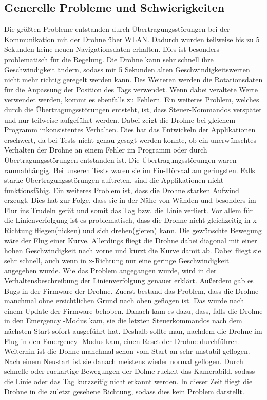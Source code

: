 \subsection*{Generelle Probleme und Schwierigkeiten}

Die größten Probleme entstanden durch Übertragungsstörungen bei der Kommunikation mit der Drohne über WLAN. Dadurch wurden teilweise bis zu 5 Sekunden keine neuen Navigationsdaten erhalten. Dies ist besonders problematisch für die Regelung. Die Drohne kann sehr schnell ihre Geschwindigkeit ändern, sodass mit 5 Sekunden alten Geschwindigkeitswerten nicht mehr richtig geregelt werden kann. Des Weiteren werden die Rotationsdaten für die Anpassung der Position des Tags verwendet. Wenn dabei veraltete Werte verwendet werden, kommt es ebenfalls zu Fehlern. Ein weiteres Problem, welches durch die Übertragungsstörungen entsteht, ist, dass Steuer-\/Kommandos verspätet und nur teilweise aufgeführt werden. Dabei zeigt die Drohne bei gleichem Programm inkonsistentes Verhalten. Dies hat das Entwickeln der Applikationen erschwert, da bei Tests nicht genau gesagt werden konnte, ob ein unerwünschtes Verhalten der Drohne an einem Fehler im Programm oder durch Übertragungsstörungen entstanden ist. Die Übertragungsstörungen waren raumabhängig. Bei unseren Tests waren sie im Fin-\/Hörsaal am geringsten. Falls starke Übertragungsstörungen auftreten, sind die Applikationen nicht funktionsfähig. Ein weiteres Problem ist, dass die Drohne starken Aufwind erzeugt. Dies hat zur Folge, dass sie in der Nähe von Wänden und besonders im Flur ins Trudeln gerät und somit das Tag bzw. die Linie verliert. Vor allem für die Linienverfolgung ist es problematisch, dass die Drohne nicht gleichzeitig in x-\/Richtung fliegen(nicken) und sich drehen(gieren) kann. Die gewünschte Bewegung wäre der Flug einer Kurve. Allerdings fliegt die Drohne dabei diagonal mit einer hohen Geschwindigkeit nach vorne und kürzt die Kurve damit ab. Dabei fliegt sie sehr schnell, auch wenn in x-\/Richtung nur eine geringe Geschwindigkeit angegeben wurde. Wie das Problem angegangen wurde, wird in der Verhaltensbeschreibung der Linienverfolgung genauer erklärt. Außerdem gab es Bugs in der Firmware der Drohne. Zuerst bestand das Problem, dass die Drohne manchmal ohne ersichtlichen Grund nach oben geflogen ist. Das wurde nach einem Update der Firmware behoben. Danach kam es dazu, dass, falls die Drohne in den Emergency -\/Modus kam, sie die letzten Steuerkommandos nach dem nächsten Start sofort ausgeführt hat. Deshalb sollte man, nachdem die Drohne im Flug in den Emergency -\/Modus kam, einen Reset der Drohne durchführen. Weiterhin ist die Dohne manchmal schon vom Start an sehr unstabil geflogen. Nach einem Neustart ist sie danach meistens wieder normal geflogen. Durch schnelle oder ruckartige Bewegungen der Dohne ruckelt das Kamerabild, sodass die Linie oder das Tag kurzzeitig nicht erkannt werden. In dieser Zeit fliegt die Drohne in die zuletzt gesehene Richtung, sodass dies kein Problem darstellt.


